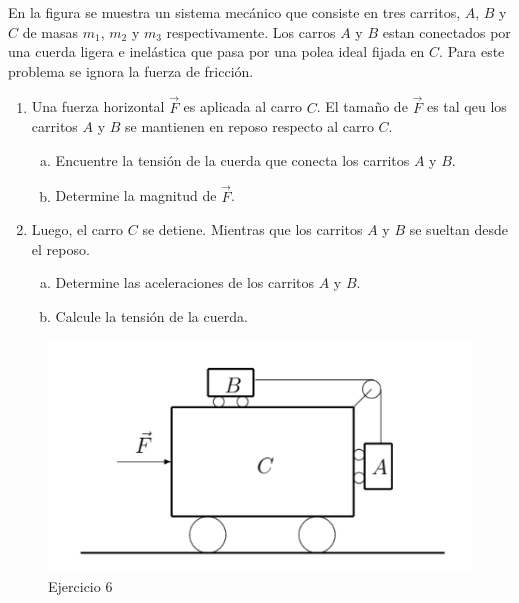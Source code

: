 \begin{mdframed}[style=warning]
	\begin{ejercicio}
		En la figura se muestra un sistema mecánico que consiste en tres carritos, $A$, $B$ y $C$ de masas $m_1$, $m_2$ y $m_3$ respectivamente. Los carros $A$ y $B$ estan conectados por una cuerda ligera e inelástica que pasa por una polea ideal fijada en $C$. Para este problema se ignora la fuerza de fricción.
	\begin{enumerate}
		\item Una fuerza horizontal $\vec{F}$ es aplicada al carro $C$. El tamaño de $\vec{F}$ es tal qeu los carritos $A$ y $B$ se mantienen en reposo respecto al carro $C$.
		\begin{enumerate}[a)]
			\item Encuentre la tensión de la cuerda que conecta los carritos $A$ y $B$.
			\item Determine la magnitud de $\vec{F}$.
		\end{enumerate}
		\item Luego, el carro $C$ se detiene. Mientras que los carritos $A$ y $B$ se sueltan desde el reposo.
		\begin{enumerate}[a)]
			\item Determine las aceleraciones de los carritos $A$ y $B$.
			\item Calcule la tensión de la cuerda.
		\end{enumerate}
	\end{enumerate}
		\begin{figure}[H]
			\centering
			\includegraphics[scale=0.4]{./img/carrito.png}
			\caption{Ejercicio 6}
		\end{figure}
	\end{ejercicio}
\end{mdframed}





